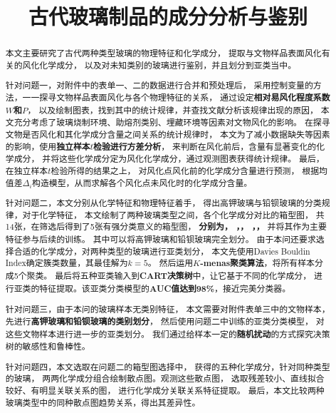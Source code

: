 \documentclass[withoutpreface,bwprint]{cumcmthesis} %
\title{古代玻璃制品的成分分析与鉴别}
\begin{document}
\maketitle
\begin{abstract}

	本文主要研究了古代两种类型玻璃的物理特征和化学成分，
	提取与文物样品表面风化有关的风化化学成分，
	以及对未知类别的玻璃进行鉴别，并且划分到亚类当中。

	针对问题一，对附件中的表单一、二的数据进行合并和预处理后，
	采用控制变量的方法，一一探寻文物样品表面风化与各个物理特征的关系，
	通过设定\textbf{相对易风化程度系数$W$和$P$}，
	以及绘制图表，找到其中的统计规律，并查找文献分析该规律出现的原因，
	本文充分考虑了玻璃烧制环境、助熔剂类别、埋藏环境等因素对文物风化的影响。
	在探寻文物是否风化和其化学成分含量之间关系的统计规律时，
	本文为了减小数据缺失等因素的影响，使用\textbf{独立样本$t$检验进行方差分析}，
	来判断在风化前后，含量有显著变化的化学成分，
	并将这些化学成分定为风化化学成分，通过观测图表获得统计规律。
	最后，在独立样本$t$检验所得的结果之上，
	对风化点风化前的化学成分含量进行预测，
	根据均值差$\Delta_i$构造模型，从而求解各个风化点未风化时的化学成分含量。

	针对问题二，本文分别从化学特征和物理特征着手，
	得出高钾玻璃与铅钡玻璃的分类规律，对于化学特征，
	本文绘制了两种玻璃类型之间，各个化学成分对比的箱型图，
	共14张，在筛选后得到了5张有强分类意义的箱型图，
	\textbf{分别为， ，， ，，}
	并将其作为主要特征参与后续的训练。
	其中可以将高钾玻璃和铅钡玻璃完全划分。
	由于本问还要求选择合适的化学成分，对两种类型的玻璃进行亚类划分，
	本文先使用Davies Bouldin Index确定簇类数量，其最佳解为$k=5$。
	然后运用\textbf{$K$-menas聚类算法}，将所有样本分成5个聚类。
	最后将五种亚类输入到\textbf{CART决策树}中，让它基于不同的化学成分，
	进行亚类的特征提取。该亚类分类模型的\textbf{AUC值达到98\%}，接近完美分类器。

	针对问题三，由于本问的玻璃样本无类别特征，
	本文需要对附件表单三中的文物样本，
	先进行\textbf{高钾玻璃和铅钡玻璃的类别划分}，
	然后使用问题二中训练的亚类分类模型，
	对这些文物样本进行进一步的亚类划分。
	我们通过给样本一定的\textbf{随机扰动}的方式探究决策树的敏感性和鲁棒性。

	针对问题四，本文选取在问题二的箱型图选择中，
	获得的五种化学成分，针对同种类型的玻璃，
	两两化学成分组合绘制散点图。观测这些散点图，
	选取残差较小、直线拟合较好、有明显关联关系的图，
	进行化学成分关联关系特征提取。
	最后，本文比较两种玻璃类型中的同种散点图趋势关系，得出其差异性。
\end{abstract}
\end{document}
